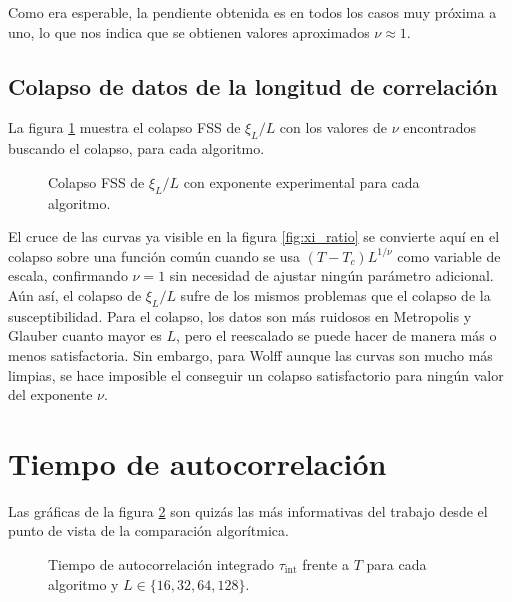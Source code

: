 Como era esperable, la pendiente obtenida es en todos los casos muy próxima a uno, lo que nos indica que se obtienen valores aproximados $\nu\approx1$.

\subsection{Colapso de datos de la longitud de correlación}

La figura \ref{fig:xi_fss} muestra el colapso FSS de $\xi_L/L$ con los valores de $\nu$ encontrados buscando el colapso, para cada algoritmo.

\begin{figure}
  \centering
  
  \caption{Colapso FSS de $\xi_L/L$ con exponente experimental para cada algoritmo.}
  \label{fig:xi_fss}
\end{figure}

El cruce de las curvas ya visible en la figura \ref{fig:xi_ratio} se convierte aquí en el colapso sobre una función común cuando se usa $(T-T_c)L^{1/\nu}$ como variable de escala, confirmando $\nu = 1$ sin necesidad de ajustar ningún parámetro adicional. Aún así, el colapso de $\xi_L/L$ sufre de los mismos problemas que el colapso de la susceptibilidad. Para el colapso, los datos son más ruidosos en Metropolis y Glauber cuanto mayor es $L$, pero el reescalado se puede hacer de manera más o menos satisfactoria. Sin embargo, para Wolff aunque las curvas son mucho más limpias, se hace imposible el conseguir un colapso satisfactorio para ningún valor del exponente $\nu$. 

\newpage
\section{Tiempo de autocorrelación} \label{sec:tint}

Las gráficas de la figura \ref{fig:tint} son quizás las más informativas del trabajo desde el punto de vista de la comparación algorítmica.

\begin{figure}
  \centering
  
  \caption{Tiempo de autocorrelación integrado $\tau_{\text{int}}$ frente a $T$ para cada algoritmo y $L \in \{16, 32, 64, 128\}$.}
  \label{fig:tint}
\end{figure}

